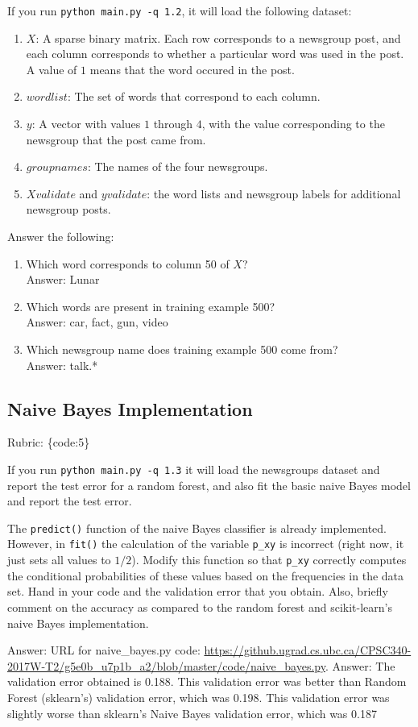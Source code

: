 \documentclass{article}
\def\blu#1{{\color{blu}#1}}
\def\gre#1{{\color{gre}#1}}
\def\enum#1{\begin{enumerate}#1\end{enumerate}}
\def\rubric#1{\gre{Rubric: \{#1\}}}{}
\begin{document}
If you run \texttt{python main.py -q 1.2}, it will load the following dataset:
\enum{
\item $X$: A sparse binary matrix. Each row corresponds to a newsgroup post, and each column corresponds to whether a particular word was used in the post. A value of $1$ means that the word occured in the post.
\item $wordlist$: The set of words that correspond to each column.
\item $y$: A vector with values $1$ through $4$, with the value corresponding to the newsgroup that the post came from.
\item $groupnames$: The names of the four newsgroups.
\item $Xvalidate$ and $yvalidate$: the word lists and newsgroup labels for additional newsgroup posts.
}
\blu{Answer the following}:
\enum{
\item Which word corresponds to column 50 of $X$?
 \textcolor{gre}{\\Answer: Lunar}
\item Which words are present in training example 500?
 \textcolor{gre}{\\Answer: car, fact, gun, video}
\item Which newsgroup name does training example 500 come from?
 \textcolor{gre}{\\Answer: talk.*}
}

\subsection{Naive Bayes Implementation}
\rubric{code:5}

If you run \texttt{python main.py -q 1.3}
it will load the newsgroups dataset and report the test error for a random forest,
and also fit the basic naive Bayes model and report the test error.

The \texttt{predict()} function of the naive Bayes classifier is already implemented.
However, in \texttt{fit()}
the calculation of the variable \texttt{p\_xy} is incorrect
(right now, it just sets all values to $1/2$).
\blu{Modify this function so that \texttt{p\_xy} correctly
computes the conditional probabilities of these values based on the
frequencies in the data set. Hand in your code and the validation error that you obtain.
Also, briefly comment on the accuracy as compared to the random forest and scikit-learn's naive Bayes implementation.}

\gre{Answer: URL for naive\_bayes.py code: \url{https://github.ugrad.cs.ubc.ca/CPSC340-2017W-T2/g5e0b_u7p1b_a2/blob/master/code/naive_bayes.py}.} \newline
\gre{Answer: The validation error obtained is 0.188. This validation error was better than Random Forest (sklearn's) validation error, which was 0.198. This validation error was slightly worse than sklearn's Naive Bayes validation error, which was 0.187}
\end{document}
